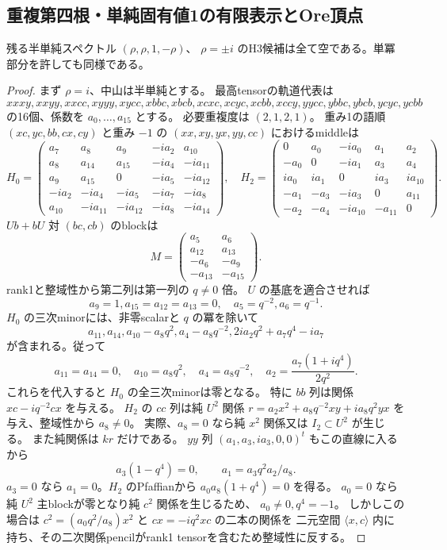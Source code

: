 \subsection{重複第四根・単純固有値1の有限表示とOre頂点}
\label{subsec:cubic-fourth-root-last-finite}
\begin{theorem}
\label{thm:cubic-fourth-root-last-finite-empty}
残る半単純スペクトル $(\rho,\rho,1,-\rho)$、
$\rho=\pm i$ のH3候補は全て空である。単冪部分を許しても同様である。
\end{theorem}
\begin{proof}
まず $\rho=i$、中山は半単純とする。
最高tensorの軌道代表は
\[
 xxxy,xxyy,xxcc,xyyy,xycc,xbbc,xbcb,xcxc,
 xcyc,xcbb,xccy,yycc,ybbc,ybcb,ycyc,ycbb
\]
の16個、係数を $a_0,\ldots,a_{15}$ とする。
必要重複度は $(2,1,2,1)$。
重み1の語順 $(xc,yc,bb,cx,cy)$ と重み $-1$ の $(xx,xy,yx,yy,cc)$ におけるmiddleは
\[
 H_0=\begin{pmatrix}
 a_7&a_8&a_9&-ia_2&a_{10}\\
 a_8&a_{14}&a_{15}&-ia_4&-ia_{11}\\
 a_9&a_{15}&0&-ia_5&-ia_{12}\\
 -ia_2&-ia_4&-ia_5&-ia_7&-ia_8\\
 a_{10}&-ia_{11}&-ia_{12}&-ia_8&-ia_{14}
 \end{pmatrix},\quad
 H_2=\begin{pmatrix}
 0&a_0&-ia_0&a_1&a_2\\
 -a_0&0&-ia_1&a_3&a_4\\
 ia_0&ia_1&0&ia_3&ia_{10}\\
 -a_1&-a_3&-ia_3&0&a_{11}\\
 -a_2&-a_4&-ia_{10}&-a_{11}&0
 \end{pmatrix}.
\]
$Ub+bU$ 対 $(bc,cb)$ のblockは
\[
 M=\begin{pmatrix}a_5&a_6\\a_{12}&a_{13}\\
 -a_6&-a_9\\-a_{13}&-a_{15}\end{pmatrix}.
\]
rank1と整域性から第二列は第一列の $q\ne0$ 倍。
$U$ の基底を適合させれば
\[
 a_9=1,a_{15}=a_{12}=a_{13}=0,\quad a_5=q^{-2},a_6=q^{-1}.
\]
$H_0$ の三次minorには、非零scalarと $q$ の冪を除いて
\[
 a_{11},a_{14},a_{10}-a_8q^2,a_4-a_8q^{-2},
 2ia_2q^2+a_7q^4-ia_7
\]
が含まれる。従って
\[
 a_{11}=a_{14}=0,\quad a_{10}=a_8q^2,\quad a_4=a_8q^{-2},\quad
 a_2=\frac{a_7(1+iq^4)}{2q^2}.
\tag{\dagger}
\]
これらを代入すると $H_0$ の全三次minorは零となる。
特に $bb$ 列は関係 $xc-iq^{-2}cx$ を与える。
$H_2$ の $cc$ 列は純 $U^2$ 関係
$r=a_2x^2+a_8q^{-2}xy+ia_8q^2yx$ を与え、整域性から $a_8\ne0$。
実際、$a_8=0$ なら純 $x^2$ 関係又は $I_2\subset U^2$ が生じる。
また純関係は $kr$ だけである。
$yy$ 列 $(a_1,a_3,ia_3,0,0)^t$ もこの直線に入るから
\[
 a_3(1-q^4)=0,\qquad a_1=a_3q^2a_2/a_8.
\]
$a_3=0$ なら $a_1=0$。$H_2$ のPfaffianから
$a_0a_8(1+q^4)=0$ を得る。
$a_0=0$ なら純 $U^2$ 主blockが零となり純 $c^2$ 関係を生じるため、
$a_0\ne0,q^4=-1$。
しかしこの場合は $c^2=(a_0q^2/a_8)x^2$ と $cx=-iq^2xc$ の二本の関係を
二元空間 $\langle x,c\rangle$ 内に持ち、その二次関係pencilがrank1 tensorを含むため整域性に反する。


\end{proof}
